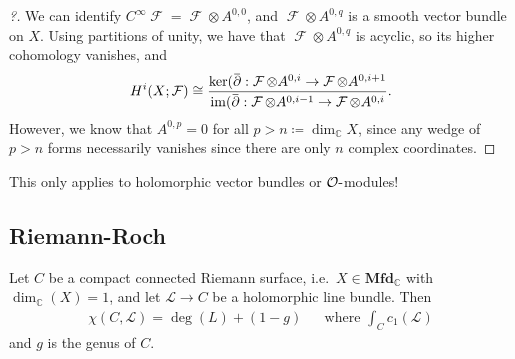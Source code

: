 \begin{proof}[?]

We can identify
\(C^{\infty }\operatorname{\mathcal{F}} = \operatorname{\mathcal{F}} \otimes A^{0, 0}\),
and \(\operatorname{\mathcal{F}} \otimes A^{0, q}\) is a smooth vector
bundle on \(X\). Using partitions of unity, we have that
\(\operatorname{\mathcal{F}} \otimes A^{0, q}\) is acyclic, so its
higher cohomology vanishes, and
\begin{align*}
H^i(X; \operatorname{\mathcal{F}} ) \cong 
\frac
{ \ker ( \mkern 1.5mu\overline{\mkern-1.5mu{\partial}\mkern-1.5mu}\mkern 1.5mu: \operatorname{\mathcal{F}}\otimes A^{0, i} \to \operatorname{\mathcal{F}} \otimes A^{0, i+1} }
{ \operatorname{im}( \mkern 1.5mu\overline{\mkern-1.5mu{\partial}\mkern-1.5mu}\mkern 1.5mu: \operatorname{\mathcal{F}}\otimes A^{0, i-1} \to \operatorname{\mathcal{F}} \otimes A^{0, i} }
.\end{align*}
However, we know that \(A^{0, p} = 0\) for all
\(p> n \coloneqq\dim_{\mathbb{C}}X\), since any wedge of \(p>n\) forms
necessarily vanishes since there are only \(n\) complex coordinates.

\end{proof}

\begin{warnings}

This only applies to holomorphic vector bundles or
\({\mathcal{O}}{\hbox{-}}\)modules!

\end{warnings}

\hypertarget{riemann-roch}{%
\subsection{Riemann-Roch}\label{riemann-roch}}

\begin{theorem}

Let \(C\) be a compact connected Riemann surface,
i.e.~\(X\in {\mathbf{Mfd}}_{\mathbb{C}}\) with
\(\dim_{\mathbb{C}}(X) = 1\), and let \(\mathcal{L}\to C\) be a
holomorphic line bundle. Then
\begin{align*}
\chi(C, \mathcal{L}) = \deg(L) + (1-g) && \text{where } \int_C c_1(\mathcal{L})
\end{align*}
and \(g\) is the genus of \(C\).

\end{theorem}


